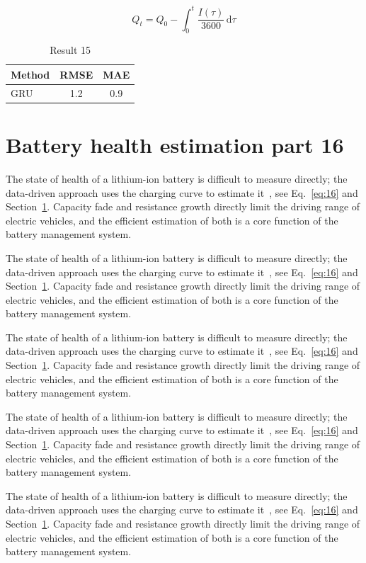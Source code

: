 \documentclass[11pt]{article}
\begin{document}
\begin{equation}\label{eq:15}
  Q_t = Q_0 - \int_0^t \frac{I(\tau)}{3600}\,\mathrm{d}\tau
\end{equation}
\begin{table}[h]\centering\begin{tabular}{lcc}\toprule Method & RMSE & MAE\\\midrule GRU & 1.2 & 0.9\\\bottomrule\end{tabular}\caption{Result 15}\end{table}

\section{Battery health estimation part 16}\label{sec:16}
The state of health of a lithium-ion battery is difficult to measure directly; the data-driven approach uses the charging curve to estimate it~\cite{a2020}, see Eq.~\eqref{eq:16} and Section~\ref{sec:16}. Capacity fade and resistance growth directly limit the driving range of electric vehicles, and the efficient estimation of both is a core function of the battery management system.

The state of health of a lithium-ion battery is difficult to measure directly; the data-driven approach uses the charging curve to estimate it~\cite{a2020}, see Eq.~\eqref{eq:16} and Section~\ref{sec:16}. Capacity fade and resistance growth directly limit the driving range of electric vehicles, and the efficient estimation of both is a core function of the battery management system.

The state of health of a lithium-ion battery is difficult to measure directly; the data-driven approach uses the charging curve to estimate it~\cite{a2020}, see Eq.~\eqref{eq:16} and Section~\ref{sec:16}. Capacity fade and resistance growth directly limit the driving range of electric vehicles, and the efficient estimation of both is a core function of the battery management system.

The state of health of a lithium-ion battery is difficult to measure directly; the data-driven approach uses the charging curve to estimate it~\cite{a2020}, see Eq.~\eqref{eq:16} and Section~\ref{sec:16}. Capacity fade and resistance growth directly limit the driving range of electric vehicles, and the efficient estimation of both is a core function of the battery management system.

The state of health of a lithium-ion battery is difficult to measure directly; the data-driven approach uses the charging curve to estimate it~\cite{a2020}, see Eq.~\eqref{eq:16} and Section~\ref{sec:16}. Capacity fade and resistance growth directly limit the driving range of electric vehicles, and the efficient estimation of both is a core function of the battery management system.
\end{document}
